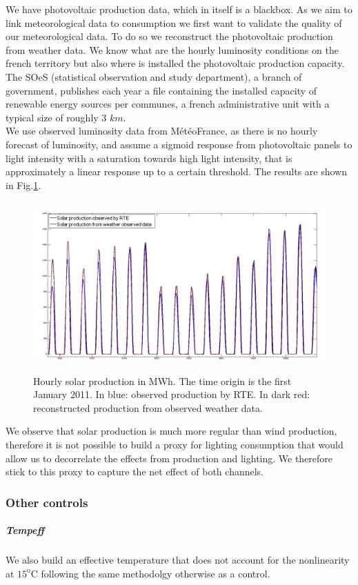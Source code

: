 We have photovoltaic production data, which in itself is a blackbox. As we aim to link meteorological data to consumption we first want to validate the quality of our meteorological data. To do so we reconstruct the photovoltaic production from weather data. We know what are the hourly luminosity conditions on the french territory but also where is installed the photovoltaic production capacity. The SOeS (statistical observation and study department), a branch of government, publishes each year a file containing the installed capacity of renewable energy sources per communes, a french administrative unit with a typical size of roughly 3 $km$. \\

We use observed luminosity data from M\'{e}t\'{e}oFrance, as there is no hourly forecast of luminosity, and assume a sigmoid response from photovoltaic panels to light intensity with a saturation towards high light intensity, that is approximately a linear response up to a certain threshold. The results are shown in Fig.\ref{solarreco}.  \\

\begin{figure}[!ht]
\centering
\includegraphics[height=65mm]{forqgis/solobs_reco.png} 
\caption{Hourly solar production in MWh. The time origin is the first January 2011. In blue: observed production by RTE. In dark red: reconstructed production from observed weather data.}
\label{solarreco}
\end{figure}


We observe that solar production is much more regular than wind production, therefore it is not possible to build a proxy for lighting consumption that would allow us to decorrelate the effects from production and lighting. We therefore stick to this proxy to capture the net effect of both channels.

\subsubsection{Other controls}
\subparagraph{Tempeff}
We also build an effective temperature that does not account for the nonlinearity at $15^\text{o}$C following the same methodolgy otherwise as a control. 


